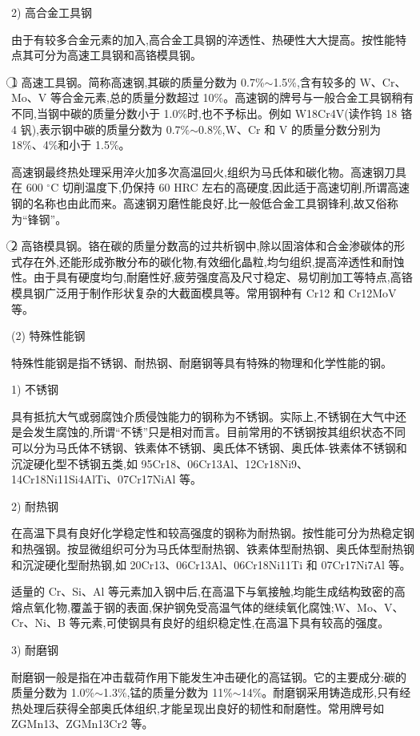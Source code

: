 \documentclass[UTF8]{ctexbook}
\newcommand{\◎}{\ensuremath{\bigcirc}}
\begin{document}
2) 高合金工具钢

由于有较多合金元素的加入,高合金工具钢的淬透性、热硬性大大提高。按性能特点其可分为高速工具钢和高铬模具钢。

\textcircled{1} 高速工具钢。简称高速钢,其碳的质量分数为 0.7\%$\sim$1.5\%,含有较多的 W、Cr、Mo、V 等合金元素,总的质量分数超过 10\%。高速钢的牌号与一般合金工具钢稍有不同,当钢中碳的质量分数小于 1.0\%时,也不予标出。例如 W18Cr4V(读作钨 18 铬 4 钒),表示钢中碳的质量分数为 0.7\%$\sim$0.8\%,W、Cr 和 V 的质量分数分别为 18\%、4\%和小于 1.5\%。

高速钢最终热处理采用淬火加多次高温回火,组织为马氏体和碳化物。高速钢刀具在 600 $^\circ$C 切削温度下,仍保持 60 HRC 左右的高硬度,因此适于高速切削,所谓高速钢的名称也由此而来。高速钢刃磨性能良好,比一般低合金工具钢锋利,故又俗称为“锋钢”。

\textcircled{2} 高铬模具钢。铬在碳的质量分数高的过共析钢中,除以固溶体和合金渗碳体的形式存在外,还能形成弥散分布的碳化物,有效细化晶粒,均匀组织,提高淬透性和耐蚀性。由于具有硬度均匀,耐磨性好,疲劳强度高及尺寸稳定、易切削加工等特点,高铬模具钢广泛用于制作形状复杂的大截面模具等。常用钢种有 Cr12 和 Cr12MoV 等。

(2) 特殊性能钢

特殊性能钢是指不锈钢、耐热钢、耐磨钢等具有特殊的物理和化学性能的钢。

1) 不锈钢

具有抵抗大气或弱腐蚀介质侵蚀能力的钢称为不锈钢。实际上,不锈钢在大气中还是会发生腐蚀的,所谓“不锈”只是相对而言。目前常用的不锈钢按其组织状态不同可以分为马氏体不锈钢、铁素体不锈钢、奥氏体不锈钢、奥氏体-铁素体不锈钢和沉淀硬化型不锈钢五类,如 95Cr18、06Cr13Al、12Cr18Ni9、14Cr18Ni11Si4AlTi、07Cr17NiAl 等。

2) 耐热钢

在高温下具有良好化学稳定性和较高强度的钢称为耐热钢。按性能可分为热稳定钢和热强钢。按显微组织可分为马氏体型耐热钢、铁素体型耐热钢、奥氏体型耐热钢和沉淀硬化型耐热钢,如 20Cr13、06Cr13Al、06Cr18Ni11Ti 和 07Cr17Ni7Al 等。

适量的 Cr、Si、Al 等元素加入钢中后,在高温下与氧接触,均能生成结构致密的高熔点氧化物,覆盖于钢的表面,保护钢免受高温气体的继续氧化腐蚀;W、Mo、V、Cr、Ni、B 等元素,可使钢具有良好的组织稳定性,在高温下具有较高的强度。

3) 耐磨钢

耐磨钢一般是指在冲击载荷作用下能发生冲击硬化的高锰钢。它的主要成分:碳的质量分数为 1.0\%$\sim$1.3\%,锰的质量分数为 11\%$\sim$14\%。耐磨钢采用铸造成形,只有经热处理后获得全部奥氏体组织,才能呈现出良好的韧性和耐磨性。常用牌号如 ZGMn13、ZGMn13Cr2 等。
\end{document}
